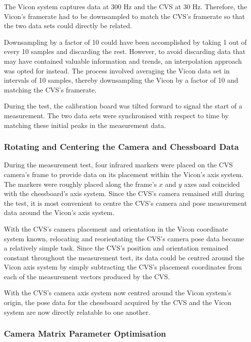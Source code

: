 The Vicon system captures data at 300 Hz and the CVS at 30 Hz. Therefore, the Vicon's framerate had to be downsampled to match the CVS's framerate so that the two data sets could directly be related. 

Downsampling by a factor of 10 could have been accomplished by taking 1 out of every 10 samples and discarding the rest. However, to avoid discarding data that may have contained valuable information and trends, an interpolation approach was opted for instead. The process involved averaging the Vicon data set in intervals of 10 samples, thereby downsampling the Vicon by a factor of 10 and matching the CVS's framerate. 

During the test, the calibration board was tilted forward to signal the start of a measurement. The two data sets were synchronised with respect to time by matching these initial peaks in the measurement data. 

\subsubsection{Rotating and Centering the Camera and Chessboard Data}
\label{sec:rotate-axes}

During the measurement test, four infrared markers were placed on the CVS camera's frame to provide data on its placement within the Vicon's axis system. The markers were roughly placed along the frame's $x$ and $y$ axes and coincided with the chessboard's axis system. Since the CVS's camera remained still during the test, it is most convenient to centre the CVS's camera and pose measurement data around the Vicon's axis system. 

With the CVS's camera placement and orientation in the Vicon coordinate system known, relocating and reorientating the CVS's camera pose data became a relatively simple task. Since the CVS's position and orientation remained constant throughout the measurement test, its data could be centred around the Vicon axis system by simply subtracting the CVS's placement coordinates from each of the measurement vectors produced by the CVS.

With the CVS's camera axis system now centred around the Vicon system's origin, the pose data for the chessboard acquired by the CVS and the Vicon system are now directly relatable to one another.  

\subsubsection{Camera Matrix Parameter Optimisation}
\label{sec:focal-optimisation}

